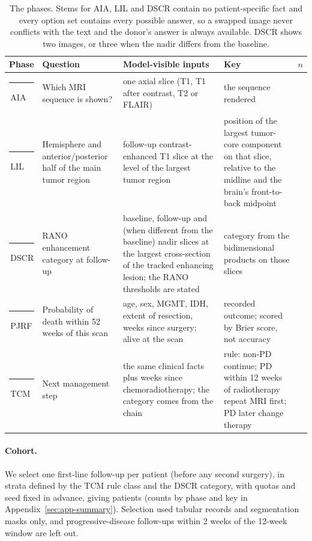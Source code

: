 \documentclass[11pt]{article}
\newcommand{\hdrrow}{\rowcolor{tblhdr}}
\newcommand{\bandrow}{\rowcolor{tblband}}
\newcommand{\ptag}[2]{\textcolor{#1}{\rule[0.02em]{0.72em}{0.72em}}\,#2}
\newcommand{\ptagAIA}{\ptag{aiacol}{AIA}}
\newcommand{\ptagLIL}{\ptag{lilcol}{LIL}}
\newcommand{\ptagDSCR}{\ptag{dscrcol}{DSCR}}
\newcommand{\ptagPJRF}{\ptag{pjrfcol}{PJRF}}
\newcommand{\ptagTCM}{\ptag{tcmcol}{TCM}}
\begin{document}
\begin{table}[t]
\centering
\footnotesize
\setlength{\tabcolsep}{3pt}
\begin{tabular}{p{1.3cm}p{4.1cm}p{4.4cm}p{4.4cm}r}
\toprule
\hdrrow Phase & Question & Model-visible inputs & Key & $n$ \\
\midrule
\ptagAIA & Which MRI sequence is shown? & one axial slice (T1, T1 after contrast, T2 or FLAIR) & the sequence rendered & \vfourNAIA{} \\
\bandrow \ptagLIL & Hemisphere and anterior/posterior half of the main tumor region & follow-up contrast-enhanced T1 slice at the level of the largest tumor region & position of the largest tumor-core component on that slice, relative to the midline and the brain's front-to-back midpoint & \vfourNLIL{} \\
\ptagDSCR & RANO enhancement category at follow-up & baseline, follow-up and (when different from the baseline) nadir slices at the largest cross-section of the tracked enhancing lesion; the RANO thresholds are stated & category from the bidimensional products on those slices & \vfourNDSCR{} \\
\bandrow \ptagPJRF & Probability of death within 52 weeks of this scan & age, sex, MGMT, IDH, extent of resection, weeks since surgery; alive at the scan & recorded outcome; scored by Brier score, not accuracy & \vfourNPJRF{} \\
\ptagTCM & Next management step & the same clinical facts plus weeks since chemoradiotherapy; the category comes from the chain & rule: non-PD continue; PD within 12 weeks of radiotherapy repeat MRI first; PD later change therapy & \vfourNTCM{} \\
\bottomrule
\end{tabular}
\caption{The phases. Stems for AIA, LIL and DSCR contain no patient-specific fact and every option set contains every possible answer, so a swapped image never conflicts with the text and the donor's answer is always available. DSCR shows two images, or three when the nadir differs from the baseline.}
\label{tab:phases}
\end{table}

\paragraph{Cohort.} We select one first-line follow-up per patient (before any second surgery), in strata defined by the TCM rule class and the DSCR category, with quotas and seed fixed in advance, giving \vfourPatients{} patients (counts by phase and key in Appendix~\ref{sec:app-summary}). Selection used tabular records and segmentation masks only, and progressive-disease follow-ups within 2 weeks of the 12-week window are left out.
\end{document}
